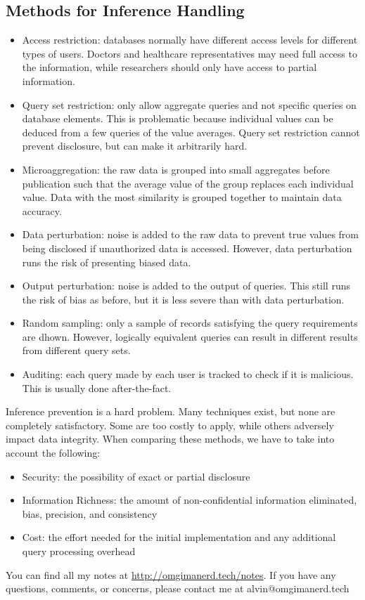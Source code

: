 \documentclass{math}
\begin{document}
\subsection*{Methods for Inference Handling}
\begin{itemize}
  \item Access restriction: databases normally have different access levels for
  different types of users. Doctors and healthcare representatives may need
  full access to the information, while researchers should only have access to
  partial information.
  \item Query set restriction: only allow aggregate queries and not specific
  queries on database elements. This is problematic because individual values
  can be deduced from a few queries of the value averages. Query set restriction
  cannot prevent disclosure, but can make it arbitrarily hard.
  \item Microaggregation: the raw data is grouped into small aggregates before
  publication such that the average value of the group replaces each individual
  value. Data with the most similarity is grouped together to maintain data
  accuracy.
  \item Data perturbation: noise is added to the raw data to prevent true values
  from being disclosed if unauthorized data is accessed. However, data
  perturbation runs the risk of presenting biased data.
  \item Output perturbation: noise is added to the output of queries. This still
  runs the risk of bias as before, but it is less severe than with data
  perturbation.
  \item Random sampling: only a sample of records satisfying the query
  requirements are dhown. However, logically equivalent queries can result in
  different results from different query sets.
  \item Auditing: each query made by each user is tracked to check if it is
  malicious. This is usually done after-the-fact.
\end{itemize}
Inference prevention is a hard problem. Many techniques exist, but none are
completely satisfactory. Some are too costly to apply, while others adversely
impact data integrity. When comparing these methods, we have to take into
account the following:
\begin{itemize}
  \item Security: the possibility of exact or partial disclosure
  \item Information Richness: the amount of non-confidential information
  eliminated, bias, precision, and consistency
  \item Cost: the effort needed for the initial implementation and any
  additional query processing overhead
\end{itemize}

\begin{center}
  You can find all my notes at \url{http://omgimanerd.tech/notes}. If you have
  any questions, comments, or concerns, please contact me at
  alvin@omgimanerd.tech
\end{center}
\end{document}

